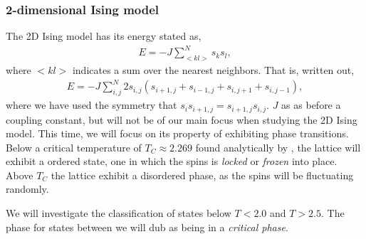 \subsubsection{2-dimensional Ising model}
The 2D Ising model has its energy stated as,
\begin{align}
    E = - J\sum^N_{<kl>} s_k s_l,
    \label{eq:2d-ising-energy}
\end{align}
where $<kl>$ indicates a sum over the nearest neighbors. That is, written out,
\begin{align}
    E = - J\sum^N_{i,j} 2 s_{i,j} (s_{i+1,j} + s_{i-1,j} + s_{i,j+1} + s_{i,j-1}),
    \label{eq:2d-ising-energy-shortened}
\end{align}
where we have used the symmetry that $s_i s_{i+1,j}=s_{i+1,j} s_{i,j}$. $J$ as as before a coupling constant, but will not be of our main focus when studying the 2D Ising model. This time, we will focus on its property of exhibiting phase transitions. Below a critical temperature of $T_C \approx 2.269$ found analytically by \citep{onsager1944crystal}, the lattice will exhibit a ordered state, one in which the spins is \textit{locked} or \textit{frozen} into place. Above $T_C$ the lattice exhibit a disordered phase, as the spins will be fluctuating randomly.

We will investigate the classification of states below $T<2.0$ and $T>2.5$. The phase for states between we will dub as being in a \textit{critical phase}.